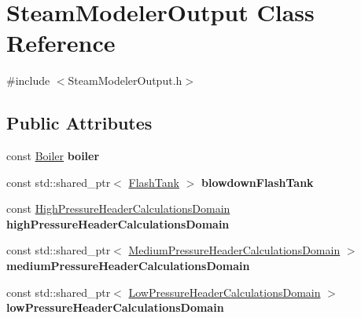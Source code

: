 \hypertarget{class_steam_modeler_output}{}\section{Steam\+Modeler\+Output Class Reference}
\label{class_steam_modeler_output}


{\ttfamily \#include $<$Steam\+Modeler\+Output.\+h$>$}

\subsection*{Public Attributes}
\begin{DoxyCompactItemize}
\item 
\mbox{\label{class_steam_modeler_output_ad62a2446320e5dcd3608672faea7b8de}} 
const \hyperlink{class_boiler}{Boiler} {\bfseries boiler}
\item 
\mbox{\label{class_steam_modeler_output_a5b1c301bad84776ac6b6cc34aa5100d3}} 
const std\+::shared\+\_\+ptr$<$ \hyperlink{class_flash_tank}{Flash\+Tank} $>$ {\bfseries blowdown\+Flash\+Tank}
\item 
\mbox{\label{class_steam_modeler_output_ab5a50701431501beb055bfdd8f0787e5}} 
const \hyperlink{class_high_pressure_header_calculations_domain}{High\+Pressure\+Header\+Calculations\+Domain} {\bfseries high\+Pressure\+Header\+Calculations\+Domain}
\item 
\mbox{\label{class_steam_modeler_output_a5ce89cfb07fa33ec3cd809b9d7c589e5}} 
const std\+::shared\+\_\+ptr$<$ \hyperlink{class_medium_pressure_header_calculations_domain}{Medium\+Pressure\+Header\+Calculations\+Domain} $>$ {\bfseries medium\+Pressure\+Header\+Calculations\+Domain}
\item 
\mbox{\label{class_steam_modeler_output_ae77a6d8b343aacad80bfcbf4f27bd9ec}} 
const std\+::shared\+\_\+ptr$<$ \hyperlink{class_low_pressure_header_calculations_domain}{Low\+Pressure\+Header\+Calculations\+Domain} $>$ {\bfseries low\+Pressure\+Header\+Calculations\+Domain}
\item 
\mbox{\label{class_steam_modeler_output_afe361281c02e58f73604558966d6fb64}} 

\end{DoxyCompactItemize}
